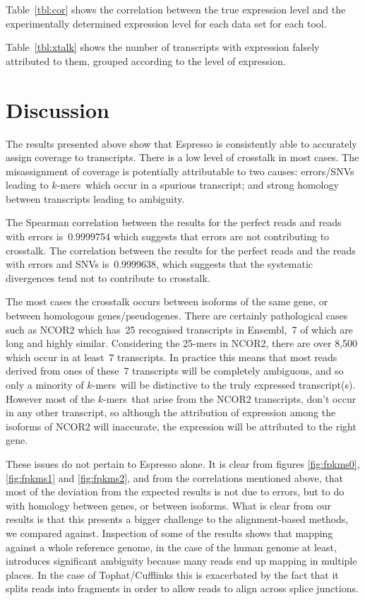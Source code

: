 \documentclass{bioinfo}
\newcommand{\Espresso}{Espresso}
\newcommand{\kmers}{$k$-mers{}}
\begin{document}
Table~\ref{tbl:cor} shows the correlation between the true expression
level and the experimentally determined expression level for each data set for each tool.

Table~\ref{tbl:xtalk} shows the number of transcripts with expression falsely attributed
to them, grouped according to the level of expression.

\section{Discussion}


The results presented above show that \Espresso{} is consistently able
to accurately assign coverage to transcripts.  There is a low level
of crosstalk in most cases.
The misassignment of coverage is potentially attributable to two
causes: errors/SNVs leading to \kmers\ which occur in a spurious
transcript; and strong homology between transcripts leading to
ambiguity.

The Spearman correlation between the results for the perfect reads and reads with errors
is~0.9999754 which suggests that errors are not contributing to crosstalk.
The correlation between the results for the perfect reads and the reads with 
errors and SNVs is~0.9999638, which suggests that the systematic divergences tend not
to contribute to crosstalk.

The most cases the crosstalk occurs between isoforms of the same
gene, or between homologous genes/pseudogenes.  There are certainly
pathological cases such as NCOR2 which has~25 recognised transcripts
in Ensembl,~7 of which are long and highly similar. Considering the
25-mers in NCOR2, there are over 8,500 which occur in at least~7
transcripts. In practice this means that most reads derived from
ones of these~7 transcripts will be completely ambiguous, and so
only a minority of \kmers\ will be distinctive to the truly expressed
transcript(s).  However most of the \kmers\ that arise from the
NCOR2 transcripts, don't occur in any other transcript, so although
the attribution of expression among the isoforms of NCOR2 will
inaccurate, the expression will be attributed to the right gene.

These issues do not pertain to \Espresso{} alone. It is clear from figures
\ref{fig:fpkms0}, \ref{fig:fpkms1} and \ref{fig:fpkms2}, and from the correlations
mentioned above, that most of the deviation from the expected results is not
due to errors, but to do with homology between genes, or between isoforms.
What is clear from our results is that this presents a bigger challenge to
the alignment-based methods, we compared against.
Inspection of some of the results shows
that mapping against a whole reference genome,
in the case of the human genome at least,
introduces significant ambiguity because many reads end up mapping in multiple places.
In the case of Tophat/Cufflinks this is exacerbated by the fact that it splits reads
into fragments in order to allow reads to align across splice junctions.
\end{document}
